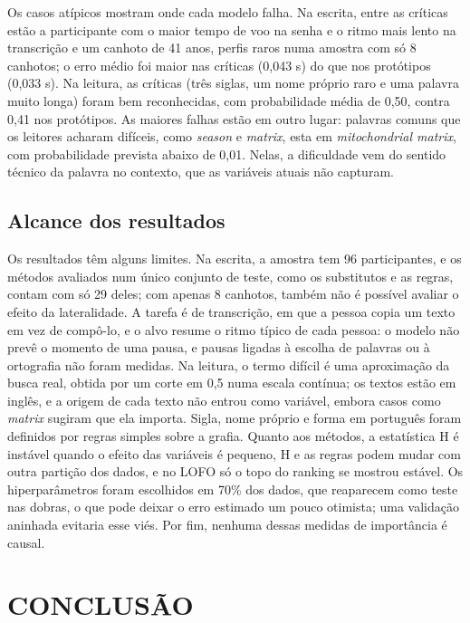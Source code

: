 \documentclass[12pt,a4paper]{article}
\begin{document}
Os casos atípicos mostram onde cada modelo falha. Na escrita, entre as críticas
estão a participante com o maior tempo de voo na senha e o ritmo mais lento na
transcrição e um canhoto de 41 anos, perfis raros numa amostra com só 8
canhotos; o erro médio foi maior nas críticas (0,043 s) do que nos protótipos
(0,033 s). Na leitura, as críticas (três siglas, um nome próprio raro e uma
palavra muito longa) foram bem reconhecidas, com probabilidade média de 0,50,
contra 0,41 nos protótipos. As maiores falhas estão em outro lugar: palavras
comuns que os leitores acharam difíceis, como \emph{season} e \emph{matrix},
esta em \emph{mitochondrial matrix}, com probabilidade prevista abaixo de 0,01.
Nelas, a dificuldade vem do sentido técnico da palavra no contexto, que as
variáveis atuais não capturam.

\subsection{Alcance dos resultados}

Os resultados têm alguns limites. Na escrita, a amostra tem 96 participantes, e os métodos
avaliados num único conjunto de teste, como os substitutos e as regras, contam
com só 29 deles; com apenas 8 canhotos, também não é possível avaliar o efeito
da lateralidade. A tarefa é de transcrição, em que a pessoa copia um texto em
vez de compô-lo, e o alvo resume o ritmo típico de cada pessoa: o modelo não
prevê o momento de uma pausa, e pausas ligadas à escolha de palavras ou à
ortografia não foram medidas. Na leitura, o termo difícil é uma aproximação da
busca real, obtida por um corte em 0,5 numa escala contínua; os textos estão em
inglês, e a origem de cada texto não entrou como variável, embora casos como
\emph{matrix} sugiram que ela importa. Sigla, nome próprio e forma em português
foram definidos por regras simples sobre a grafia. Quanto aos métodos, a
estatística H é instável quando o efeito das variáveis é pequeno, H e as regras
podem mudar com outra partição dos dados, e no LOFO só o topo do ranking se
mostrou estável. Os hiperparâmetros foram escolhidos em 70\% dos dados, que
reaparecem como teste nas dobras, o que pode deixar o erro estimado um pouco
otimista; uma validação aninhada evitaria esse viés. Por fim, nenhuma dessas
medidas de importância é causal.

\section{CONCLUSÃO}
\end{document}
